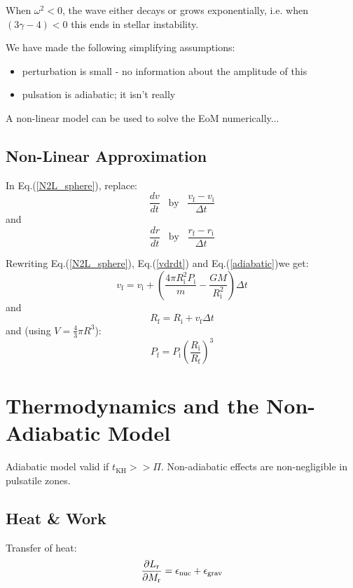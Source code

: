 \documentclass{spy}
\begin{document}
When \(\omega^2 < 0\), the wave either decays or grows exponentially, i.e. when \((3\gamma - 4) < 0\) this ends in stellar instability.  

We have made the following simplifying assumptions:
\begin{itemize}
    \item perturbation is small - no information about the amplitude of this
    \item pulsation is adiabatic; it isn't really
\end{itemize}

A non-linear model can be used to solve the EoM numerically...

\subsection{Non-Linear Approximation}
In Eq.(\ref{N2L_sphere}), replace:
\begin{equation}
    \frac{dv}{dt} \;\;\; \text{by}  \;\;\; \frac{v_\mathrm{f} - v_\mathrm{i}}{\Delta t}
\end{equation}
and
\begin{equation}
     \frac{dr}{dt} \;\;\; \text{by}  \;\;\; \frac{r_\mathrm{f} - r_\mathrm{i}}{\Delta t}
\end{equation}

Rewriting Eq.(\ref{N2L_sphere}), Eq.(\ref{vdrdt}) and Eq.(\ref{adiabatic})we get:
\begin{equation}
     v_\mathrm{f} = v_\mathrm{i} + \left(\frac{4\pi R^2_\mathrm{i} P_\mathrm{i}}{m} - \frac{GM}{R^2_\mathrm{i}}\right) \Delta t
\end{equation}
and
\begin{equation}
     R_\mathrm{f} = R_\mathrm{i} + v_\mathrm{f} \Delta t
\end{equation}
and (using \(V = \frac{4}{3} \pi R^3\)):
\begin{equation}
     P_\mathrm{f} = P_\mathrm{i} \left(\frac{R_\mathrm{i}}{R_\mathrm{f}} \right)^3
\end{equation}


\section{Thermodynamics and the Non-Adiabatic Model}
Adiabatic model valid if \(t_\mathrm{KH}>>\Pi\). Non-adiabatic effects are non-negligible in pulsatile zones. 

\subsection{Heat \& Work}
Transfer of heat:
\begin{equation}
    \pdv{L_\mathrm{r}}{M_\mathrm{r}} = \epsilon_\mathrm{nuc} + \epsilon_\mathrm{grav}
\end{equation}
\end{document}
